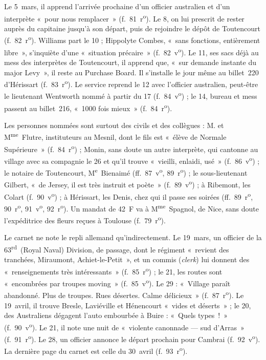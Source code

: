 Le 5~mars, il apprend l'arrivée prochaine d'un officier australien et d'un interprète «~pour nous remplacer~» (f.~81~r\textsuperscript{o}). Le 8, on lui prescrit de rester auprès du capitaine jusqu'à son départ, puis de rejoindre le dépôt de Toutencourt (f.~82~r\textsuperscript{o}). Williams part le 10 ; Hippolyte Combes, «~sans fonctions, entièrement libre~», s'inquiète d'une «~situation précaire~» (f.~82~v\textsuperscript{o}). Le 11, ses sacs déjà au mess des interprètes de Toutencourt, il apprend que, «~sur demande instante du major Levy~», il reste au Purchase Board. Il s'installe le jour même au billet~220 d'Hérissart (f.~83~r\textsuperscript{o}). Le service reprend le 12 avec l'officier australien, peut-être le lieutenant Wentworth nommé à partir du 17 (f.~84~v\textsuperscript{o}) ; le 14, bureau et mess passent au billet~216, «~1000 fois mieux~» (f.~84~r\textsuperscript{o}).

Les personnes nommées sont surtout des civils et des collègues : M. et M\textsuperscript{me}~Flutre, instituteurs au Mesnil, dont le fils est «~élève de Normale Supérieure~» (f.~84~r\textsuperscript{o}) ; Monin, sans doute un autre interprète, qui cantonne au village avec sa compagnie le 26 et qu'il trouve «~vieilli, enlaidi, usé~» (f.~86~v\textsuperscript{o}) ; le notaire de Toutencourt, M\textsuperscript{e}~Bienaimé (ff.~87~v\textsuperscript{o}, 89~r\textsuperscript{o}) ; le sous-lieutenant Gilbert, «~de Jersey, il est très instruit et poète~» (f.~89~v\textsuperscript{o}) ; à Ribemont, les Colart (f.~90~v\textsuperscript{o}) ; à Hérissart, les Denis, chez qui il passe ses soirées (ff.~89~r\textsuperscript{o}, 90~r\textsuperscript{o}, 91~v\textsuperscript{o}, 92~r\textsuperscript{o}). Un mandat de 42~F va à M\textsuperscript{me}~Spagnol, de Nice, sans doute l'expéditrice des fleurs reçues à Toulouse (f.~79~r\textsuperscript{o}).

Le carnet ne note le repli allemand qu'indirectement. Le 19~mars, un officier de la 63\textsuperscript{rd}~(Royal Naval) Division, de passage, dont le régiment «~revient des tranchées, Miraumont, Achiet-le-Petit~», et un commis (\textit{clerk}) lui donnent des «~renseignements très intéressants~» (f.~85~r\textsuperscript{o}) ; le 21, les routes sont «~encombrées par troupes moving~» (f.~85~v\textsuperscript{o}). Le 29 : «~Village paraît abandonné. Plus de troupes. Rues désertes. Calme délicieux~» (f.~87~r\textsuperscript{o}). Le 19~avril, il trouve Bresle, Laviéville et Hénencourt «~vides et déserts~» ; le 20, des Australiens dégagent l'auto embourbée à Buire : «~Quels types~!~» (f.~90~v\textsuperscript{o}). Le 21, il note une nuit de «~violente canonnade --- sud d'Arras~» (f.~91~r\textsuperscript{o}). Le 28, un officier annonce le départ prochain pour Cambrai (f.~92~v\textsuperscript{o}). La dernière page du carnet est celle du 30~avril (f.~93~r\textsuperscript{o}).


